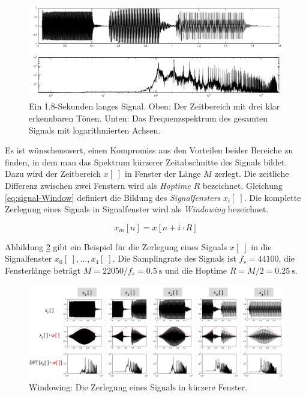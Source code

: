 \begin{figure}[h]
	\centering
	\includegraphics[width=1\textwidth]{bilder/stft01.png}
	\caption[Beispiel für die DFT]{Ein 1.8-Sekunden langes Signal. Oben: Der Zeitbereich mit drei klar erkennbaren Tönen. Unten: Das Frequenzspektrum des gesamten Signals mit logarithmierten Achsen.}
	\label{img:stft01}
\end{figure}

Es ist wünschenswert, einen Kompromiss aus den Vorteilen beider Bereiche zu finden, in dem man das Spektrum kürzerer Zeitabschnitte des Signals bildet. Dazu wird der Zeitbereich $x[\;]$ in Fenster der Länge $M$ zerlegt. Die zeitliche Differenz zwischen zwei Fenstern wird als \emph{Hoptime} $R$ bezeichnet. Gleichung \ref{eq:signal-Window} definiert die Bildung des \emph{Signalfensters} $x_i[\;]$. Die komplette Zerlegung eines Signals in Signalfenster wird als \emph{Windowing} bezeichnet.\cite{juliusSmith}

\begin{equation}
x_{m}[n] = x[n+i\cdot R]
\label{eq:signal-Window}
\end{equation}

Abbildung \ref{img:siganlWindows} gibt ein Beispiel für die Zerlegung eines Signals $x[\;]$ in die Signalfenster $x_0[\;] ,\ldots, x_4[\;]$. Die Samplingrate des Signals ist $f_s = 44100$, die Fensterlänge beträgt $M = 22050 / f_s = \SI{0.5}{\second}$ und die Hoptime $R = M / 2= \SI{0.25}{\second}$.

\begin{figure}[h]
	\centering
	\includegraphics[width=1\textwidth]{bilder/signalWindows03.png}
	\caption{Windowing: Die Zerlegung eines Signals in kürzere Fenster.}
	\label{img:siganlWindows}
\end{figure}

